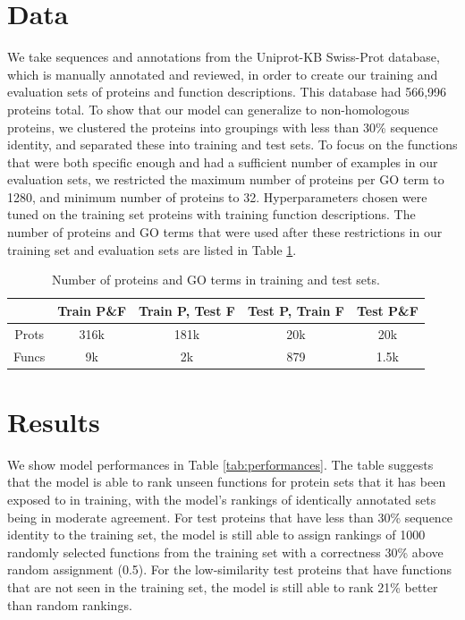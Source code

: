 \documentclass{article}
\begin{document}
\section{Data}
We take sequences and annotations from the Uniprot-KB Swiss-Prot database, which is manually annotated and reviewed, in order to create our training and evaluation sets of proteins and function descriptions. 
This database had 566,996 proteins total. 
To show that our model can generalize to non-homologous proteins, we clustered the proteins into groupings with less than 30\% sequence identity, and separated these into training and test sets. 
To focus on the functions that were both specific enough and had a sufficient number of examples in our evaluation sets, we restricted the maximum number of proteins per GO term to 1280, and minimum number of proteins to 32. 
Hyperparameters chosen were tuned on the training set proteins with training function descriptions.
The number of proteins and GO terms that were used after these restrictions in our training set and evaluation sets are listed in Table \ref{tab:datasets}.
\begin{table}
    \caption{Number of proteins and GO terms in training and test sets.}
	\centering
	\begin{tabular}{c|cccc}
		\toprule
         & Train P\&F & Train P, Test F & Test P, Train F & Test P\&F \\
		\midrule
        Prots & 316k & 181k & 20k & 20k \\
        Funcs & 9k & 2k & 879 & 1.5k \\
		\bottomrule
	\end{tabular}
	\label{tab:datasets}
\end{table}

\section{Results} %

        We show model performances in Table \ref{tab:performances}. The table suggests that the model is able to rank unseen functions for protein sets that it has been exposed to in training, with the model's rankings of identically annotated sets being in moderate agreement. For test proteins that have less than 30\% sequence identity to the training set, the model is still able to assign rankings of 1000 randomly selected functions from the training set with a correctness 30\% above random assignment (0.5). For the low-similarity test proteins that have functions that are not seen in the training set, the model is still able to rank 21\% better than random rankings.
\end{document}
